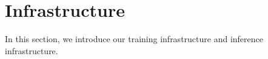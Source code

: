 \section{Infrastructure}
In this section, we introduce our training infrastructure and inference infrastructure.  



